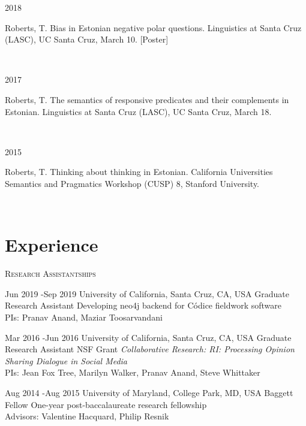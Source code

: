 \documentclass[12pt]{article} %
\begin{document}
\begin{minipage}[t]{3cm}
2018
\end{minipage}
\begin{minipage}[t]{\smallertextwidth}
Roberts, T. Bias in Estonian negative polar questions. Linguistics at Santa Cruz (LASC), UC Santa Cruz, March 10. [Poster]\end{minipage}\\

\begin{minipage}[t]{3cm}
2017
\end{minipage}
\begin{minipage}[t]{\smallertextwidth}
Roberts, T. The semantics of responsive predicates and their complements in Estonian. Linguistics at Santa Cruz (LASC), UC Santa Cruz, March 18.\end{minipage}\\

\begin{minipage}[t]{3cm}
2015
\end{minipage}
\begin{minipage}[t]{\smallertextwidth}
Roberts, T. Thinking about thinking in Estonian. California Universities Semantics and Pragmatics Workshop (CUSP) 8, Stanford University.\end{minipage}\\

\section{Experience}

\textsc{Research Assistantships}


\job
{Jun 2019 -}{Sep 2019}
{University of California, Santa Cruz, CA, USA}
{}
{Graduate Research Assistant}
{Developing neo4j backend for Códice fieldwork software\\  PIs: Pranav Anand, Maziar Toosarvandani}


\job
{Mar 2016 -}{Jun 2016}
{University of California, Santa Cruz, CA, USA}
{}
{Graduate Research Assistant}
{NSF Grant \emph{Collaborative Research: RI: Processing Opinion Sharing Dialogue in Social Media}\\  PIs: Jean Fox Tree, Marilyn Walker, Pranav Anand, Steve Whittaker}

\job
{Aug 2014 -}{Aug 2015}
{University of Maryland, College Park, MD, USA}
{}
{Baggett Fellow}
{One-year post-baccalaureate research fellowship\\
Advisors: Valentine Hacquard, Philip Resnik}
\end{document}
